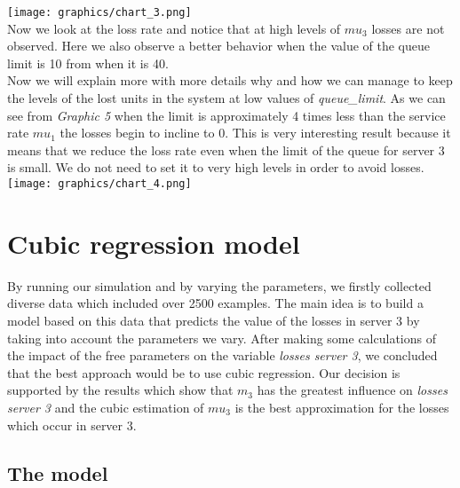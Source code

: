 \documentclass[12pt]{article}
\theoremstyle{plain}
\begin{document}
\texttt{[image: graphics/chart\_3.png]}\\

Now we look at the loss rate and notice that at high levels of $mu_3$ losses are
not observed. Here we also observe a better behavior when the value of the queue
limit is 10 from when it is 40.\\
Now we will explain more with more details why and how we can manage to keep the
levels of the lost units in the system at low values of \emph{queue\_limit}. As
we can see from \emph{Graphic 5} when the limit is approximately 4 times less
than the service rate $mu_1$ the losses begin to incline to 0. This is very
interesting result because it means that we reduce the loss rate even when the
limit of the queue for server 3 is small. We do not need to set it to very high
levels in order to avoid losses.\\

\texttt{[image: graphics/chart\_4.png]}\\

\section*{\textbf{Cubic regression model}
}

By running our simulation and by varying the parameters, we firstly collected
diverse data which included over 2500 examples. The main idea is to build a model
based on this data that predicts the value of the losses in server 3 by taking
into account the parameters we vary. After making some calculations of the impact of the
free parameters on the variable \emph{losses server 3}, we concluded that the
best approach would be to use cubic regression. Our decision is supported by the
results which show that $m_3$ has the greatest influence on \emph{losses
server 3} and the cubic estimation of $mu_3$ is the best approximation for
the losses which occur in server 3.

\subsection*{The model}
\end{document}
